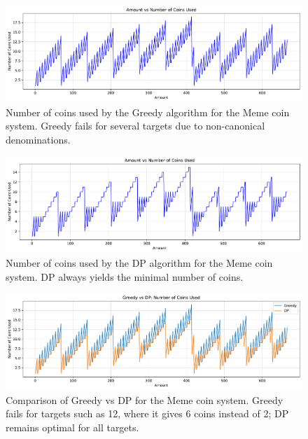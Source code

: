 \documentclass[12pt,a4paper]{report}
\begin{document}
\begin{figure}[H]
  \centering
  \includegraphics[width=\textwidth]{graphs/greedy_coins_meme_plot.pdf}
  \caption{Number of coins used by the Greedy algorithm for the Meme coin system. Greedy fails for several targets due to non-canonical denominations.}
  \label{fig:greedy_coins_meme_plot}
\end{figure}

\begin{figure}[H]
  \centering
  \includegraphics[width=\textwidth]{graphs/dp_coins_meme_plot.pdf}
  \caption{Number of coins used by the DP algorithm for the Meme coin system. DP always yields the minimal number of coins.}
  \label{fig:dp_coins_meme_plot}
\end{figure}

\begin{figure}[H]
  \centering
  \includegraphics[width=\textwidth]{graphs/compare_coins_meme_plot.pdf}
  \caption{Comparison of Greedy vs DP for the Meme coin system. Greedy fails for targets such as 12, where it gives 6 coins instead of 2; DP remains optimal for all targets.}
  \label{fig:compare_coins_meme_plot}
\end{figure}
\end{document}
